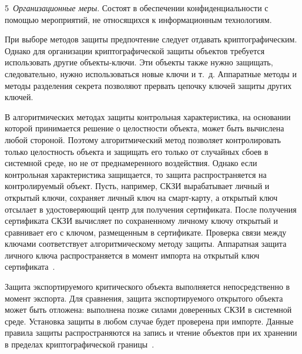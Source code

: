 5~{\it Организационные меры}. 
Состоят в обеспечении конфиденциальности с помощью мероприятий,
не относящихся к информационным технологиям.


При выборе методов защиты предпочтение следует отдавать криптографическим. 
Однако для организации криптографической защиты объектов требуется использовать 
другие объекты-ключи. Эти объекты также нужно защищать, следовательно, нужно 
использоваться новые ключи и т.~д. Аппаратные методы и методы разделения 
секрета позволяют прервать цепочку ключей защиты других ключей.

В алгоритмических методах защиты контрольная характеристика, 
на основании которой принимается решение о целостности объекта, 
может быть вычислена любой стороной. Поэтому алгоритмический метод позволяет 
контролировать только целостность объекта и защищать его только от случайных 
сбоев в системной среде, но не от преднамеренного воздействия. 
%
Однако если контрольная характеристика защищается, то защита распространяется
на контролируемый объект. 
%
Пусть, например, СКЗИ вырабатывает личный и открытый ключи,
сохраняет личный ключ на смарт-карту, 
а открытый ключ отсылает в удостоверяющий центр для получения сертификата. 
%
После получения сертификата СКЗИ вычисляет по сохраненному личному ключу 
открытый и сравнивает его с ключом, размещенным в сертификате.
%
Проверка связи между ключами соответствует алгоритмическому методу защиты.
Аппаратная защита личного ключа распространяется в момент импорта
на открытый ключ сертификата~.

Защита экспортируемого критического объекта выполняется непосредственно в момент
экспорта. Для сравнения, защита экспортируемого открытого объекта может быть
отложена: выполнена позже силами доверенных СКЗИ в системной среде.
%
Установка защиты в любом случае будет проверена при импорте. 
%
Данные правила защиты распространяются на запись и чтение объектов при 
их хранении в пределах криптографической границы~. 

